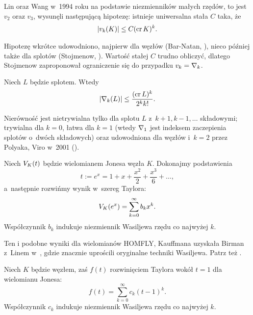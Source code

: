 %
Lin oraz Wang \cite{wang96} w~1994 roku na podstawie niezmienników małych rzędów, to jest $v_2$ oraz $v_3$, wysunęli następującą hipotezę: istnieje uniwersalna stała $C$ taka, że
\begin{equation}
    |v_k(K)| \le C (\operatorname{cr} K)^k.
\end{equation}

Hipotezę wkrótce udowodniono, najpierw dla węzłów (Bar-Natan, \cite{barnatan95}), nieco później także dla splotów (Stojmenow, \cite{stoimenow001}).
Wartość stałej $C$ trudno obliczyć, dlatego Stojmenow zaproponował \cite[problem 1.17]{ohtsuki02} ograniczenie się do przypadku $v_k = \nabla_k$.

\begin{conjecture}
    Niech $L$ będzie splotem.
    Wtedy
    \begin{equation}
        |\nabla_k(L)| \le \frac{(\operatorname{cr} L)^k}{2^kk!}.
    \end{equation}
\end{conjecture}

Nierówność jest nietrywialna tylko dla splotu $L$ z~$k+1, k-1, \ldots$ składowymi; trywialna dla $k = 0$, łatwa dla $k=1$ (wtedy $\nabla_1$ jest indeksem zaczepienia splotów o~dwóch składowych) oraz udowodniona dla węzłów i~$k=2$ przez Polyaka, Viro w~2001 (\cite{polyak01}).

\begin{example}
%
    Niech $V_K(t)$ będzie wielomianem Jonesa węzła $K$.
    Dokonajmy podstawienia
    \begin{equation}
        t := e^x = 1 + x + \frac{x^2}{2} + \frac{x^3}{6} + \ldots,
    \end{equation}
    a~następnie rozwińmy wynik w~szereg Taylora:
    \begin{equation}
        V_K(e^x) = \sum_{k = 0}^\infty b_k x^k.
    \end{equation}
    Współczynnik $b_{k}$ indukuje niezmiennik Wasiljewa rzędu co najwyżej $k$.
\end{example}

Ten i podobne wyniki dla wielomianów HOMFLY, Kauffmana uzyskała Birman z~Linem w~\cite{birman93}, gdzie znacznie uprościli oryginalne techniki Wasiljewa.
Patrz też \cite[s. 56]{chmutov12}.

\begin{example}
    Niech $K$ będzie węzłem, zaś $f(t)$ rozwinięciem Taylora wokół $t = 1$ dla wielomianu Jonesa:
    \begin{equation}
        f(t) = \sum_{k = 0}^\infty c_k (t-1)^k.
    \end{equation}
    Współczynnik $c_{k}$ indukuje niezmiennik Wasiljewa rzędu co najwyżej $k$.
\end{example}

